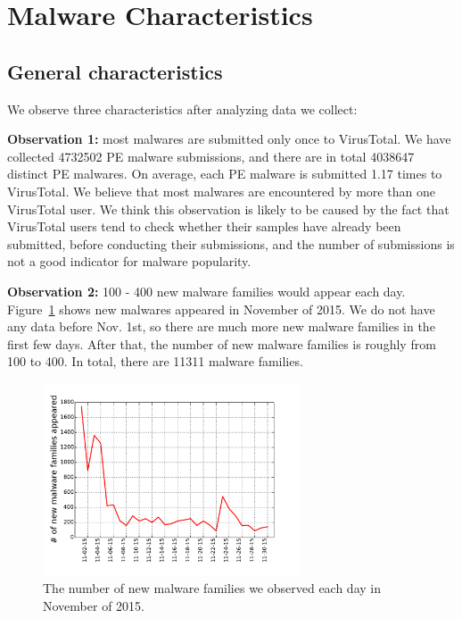 \section{Malware Characteristics}

\subsection{General characteristics}

We observe three characteristics after analyzing data we collect:

{\bf Observation 1:} 
most malwares are submitted only once to VirusTotal. 
We have collected 4732502 PE malware submissions, and there are in total 4038647 distinct PE malwares. 
On average, each PE malware is submitted 1.17 times to VirusTotal. 
We believe that most malwares are encountered by more than one VirusTotal user. 
We think this observation is likely to be caused by the fact that VirusTotal users 
tend to check whether their samples have already been submitted, 
before conducting their submissions, 
and the number of submissions is not a good indicator for malware popularity. 


{\bf Observation 2:} 
100 - 400 new malware families would appear each day. 
Figure~\ref{fig:new} shows new malwares appeared in November of 2015. 
We do not have any data before Nov. 1st, 
so there are much more new malware families in the first few days.
After that, the number of new malware families is roughly from 100 to 400. 
In total, there are 11311 malware families. 




\begin{figure}[t!]
\begin{center}
\includegraphics[width=3.0in]{figure/new_family}
\caption{The number of new malware families we observed each day in November of 2015.}
\label{fig:new}
\end{center}
\end{figure}

